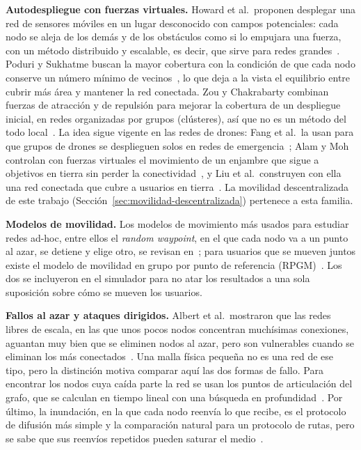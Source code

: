 \textbf{Autodespliegue con fuerzas virtuales.} Howard et al.\ proponen desplegar
una red de sensores móviles en un lugar desconocido con campos potenciales: cada
nodo se aleja de los demás y de los obstáculos como si lo empujara una fuerza, con
un método distribuido y escalable, es decir, que sirve para redes
grandes~\cite{Howard2002PotentialFields}. Poduri y Sukhatme buscan la mayor
cobertura con la condición de que cada nodo conserve un número mínimo de
vecinos~\cite{Poduri2004ConstrainedCoverage}, lo que deja a la vista el equilibrio
entre cubrir más área y mantener la red conectada. Zou y Chakrabarty combinan
fuerzas de atracción y de repulsión para mejorar la cobertura de un despliegue
inicial, en redes organizadas por grupos (clústeres), así que no es un método del
todo local~\cite{Zou2003VirtualForces}. La idea sigue vigente en las redes de
drones: Fang et al.\ la usan para que grupos de drones se desplieguen solos en redes
de emergencia~\cite{Fang2021Uav}; Alam y Moh controlan con fuerzas virtuales el
movimiento de un enjambre que sigue a objetivos en tierra sin perder la
conectividad~\cite{Alam2022JTCR}, y Liu et al.\ construyen con ella una red
conectada que cubre a usuarios en tierra~\cite{Liu2024Uav}. La movilidad
descentralizada de este trabajo (Sección~\ref{sec:movilidad-descentralizada})
pertenece a esta familia.

\textbf{Modelos de movilidad.} Los modelos de movimiento más usados para estudiar
redes ad-hoc, entre ellos el \textit{random waypoint}, en el que cada nodo va a un
punto al azar, se detiene y elige otro, se revisan en~\cite{Camp2002MobilitySurvey};
para usuarios que se mueven juntos existe el modelo de movilidad en grupo por punto
de referencia (RPGM)~\cite{Hong1999GroupMobility}. Los dos se incluyeron en el
simulador para no atar los resultados a una sola suposición sobre cómo se mueven
los usuarios.

\textbf{Fallos al azar y ataques dirigidos.} Albert et al.\ mostraron que las redes
libres de escala, en las que unos pocos nodos concentran muchísimas conexiones,
aguantan muy bien que se eliminen nodos al azar, pero son vulnerables cuando se
eliminan los más conectados~\cite{Albert2000ErrorAttack}. Una malla física pequeña
no es una red de ese tipo, pero la distinción motiva comparar aquí las dos formas de
fallo. Para encontrar los nodos cuya caída parte la red se usan los puntos de
articulación del grafo, que se calculan en tiempo lineal con una búsqueda en
profundidad~\cite{Hopcroft1973Algorithm447}. Por último, la inundación, en la que
cada nodo reenvía lo que recibe, es el protocolo de difusión más simple y la
comparación natural para un protocolo de rutas, pero se sabe que sus reenvíos
repetidos pueden saturar el medio~\cite{Ni1999BroadcastStorm}.

